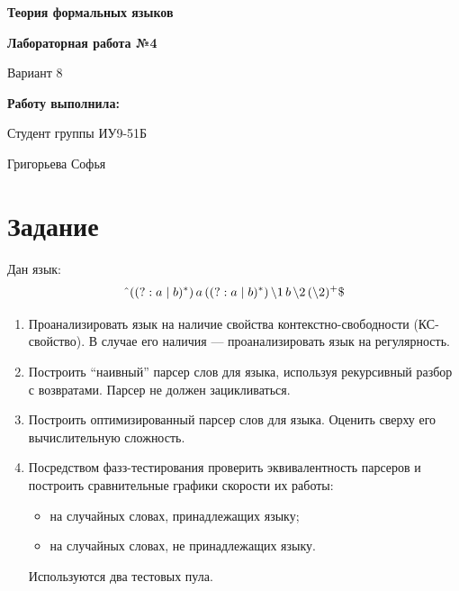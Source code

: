 \documentclass[a4paper,12pt]{article}
\begin{document}
\begin{titlepage}
\centering

{\LARGE \textbf{Теория формальных языков} \par}
\vspace{0.5cm}

{\large \textbf{Лабораторная работа №4} \par}
{\large Вариант 8 \par}
\vspace{1.5cm}

{\large \textbf{Работу выполнила:} \par}
{\large Студент группы ИУ9-51Б \par}
{\large Григорьева Софья \par}

\end{titlepage}



\tableofcontents
\newpage


\section{Задание}

Дан язык:
\[
\text{\^{}}((?:a \mid b)^*)\, a \,((?:a \mid b)^*)\, \backslash 1\, b\, \backslash 2\, (\backslash 2)^+\$
\]

\begin{enumerate}[label=\arabic*.]
    \item Проанализировать язык на наличие свойства контекстно-свободности (КС-свойство). В случае его наличия — проанализировать язык на регулярность.
    
    \item Построить ``наивный'' парсер слов для языка, используя рекурсивный разбор с возвратами. Парсер не должен зацикливаться.
    
    \item Построить оптимизированный парсер слов для языка. Оценить сверху его вычислительную сложность.
    
    \item Посредством фазз-тестирования проверить эквивалентность парсеров и построить сравнительные графики скорости их работы:
    \begin{itemize}
        \item на случайных словах, принадлежащих языку;
        \item на случайных словах, не принадлежащих языку.
    \end{itemize}
    Используются два тестовых пула.
\end{enumerate}
\end{document}
